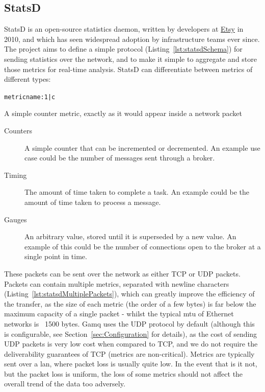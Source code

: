 \subsection{StatsD}
\label{sub:StatsD}

StatsD is an open-source statistics daemon, written by developers at
\href{https://www.etsy.com/uk/}{Etsy} in 2010\cite{statsd}, and which has seen
widespread adoption by infrastructure teams ever since. The project aims to
define a simple protocol (Listing~\ref{lst:statsdSchema}) for sending statistics
over the network, and to make it simple to aggregate and store those metrics for
real-time analysis. StatsD can differentiate between metrics of different types:

\begin{listing}
  \centering
  \texttt{metricname:1|c}
  \caption{A simple counter metric, exactly as it would appear inside a network packet}
  \label{lst:statsdSchema}
\end{listing}

\begin{description}
  \item[Counters] A simple counter that can be incremented or decremented. An
  example use case could be the number of messages sent through a broker.
  \item[Timing] The amount of time taken to complete a task. An example could be
  the amount of time taken to process a message.
  \item[Gauges] An arbitrary value, stored until it is superseded by a new
  value. An example of this could be the number of connections open to the
  broker at a single point in time.
\end{description}

These packets can be sent over the network as either TCP or UDP packets. Packets
can contain multiple metrics, separated with newline characters
(Listing~\ref{lst:statsdMultiplePackets}), which can greatly improve the
efficiency of the transfer, as the size of each metric (the order of a few
bytes) is far below the maximum capacity of a single packet - whilst the typical
\gls{mtu} of Ethernet networks is ~1500 bytes\cite{rfc1191}. Gamq uses the UDP
protocol by default (although this is configurable, see
Section~\ref{sec:Configuration} for details), as the cost of sending UDP packets
is very low cost when compared to TCP, and we do not require the deliverability
guarantees of TCP (metrics are non-critical). Metrics are typically sent over a
\gls{lan}, where packet loss is usually quite low. In the event that is it not,
but the packet loss is uniform, the loss of some metrics should not affect the
overall trend of the data too adversely.

